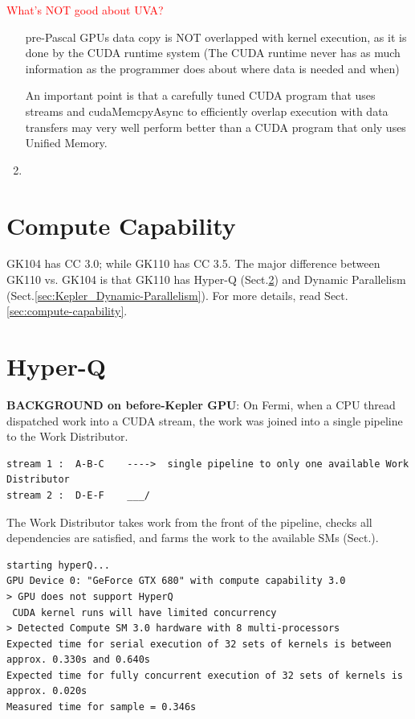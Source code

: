 \textcolor{red}{What's NOT good about UVA?}
\begin{enumerate}
  
  \item [pre-Pascal GPUs] data copy is NOT overlapped with kernel execution, as it is done by the
  CUDA runtime system (The CUDA runtime never has as much information as the
  programmer does about where data is needed and when)

An important point is that a carefully tuned CUDA program that uses streams and
cudaMemcpyAsync to efficiently overlap execution with data transfers may very
well perform better than a CUDA program that only uses Unified Memory.
  
  \item 
\end{enumerate}


\section{Compute Capability}

GK104 has CC 3.0; while GK110 has CC 3.5. The major difference between GK110 vs.
GK104 is that GK110 has Hyper-Q (Sect.\ref{sec:Kepler_Hyper-Q}) and Dynamic
Parallelism (Sect.\ref{sec:Kepler_Dynamic-Parallelism}). For more details, read
Sect.\ref{sec:compute-capability}.

\section{Hyper-Q}
\label{sec:Kepler_Hyper-Q}
\label{sec:Hyper-Q}

{\bf BACKGROUND on before-Kepler GPU}: On Fermi, when a CPU thread dispatched
work into a CUDA stream, the work was joined into a single pipeline to the Work
Distributor.
\begin{verbatim}
stream 1 :  A-B-C    ---->  single pipeline to only one available Work Distributor
stream 2 :  D-E-F    ___/
\end{verbatim}
The Work
Distributor takes work from the front of the
pipeline, checks all dependencies are satisfied, and
farms the work to the available SMs (Sect.).

\begin{verbatim}
starting hyperQ...
GPU Device 0: "GeForce GTX 680" with compute capability 3.0
> GPU does not support HyperQ
 CUDA kernel runs will have limited concurrency
> Detected Compute SM 3.0 hardware with 8 multi-processors
Expected time for serial execution of 32 sets of kernels is between approx. 0.330s and 0.640s
Expected time for fully concurrent execution of 32 sets of kernels is approx. 0.020s
Measured time for sample = 0.346s
\end{verbatim}


